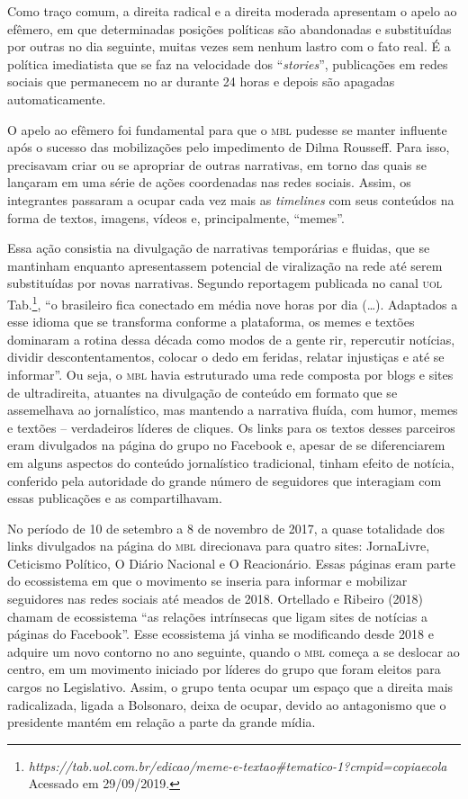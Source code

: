 Como traço comum, a direita radical e a direita moderada apresentam o
apelo ao efêmero, em que determinadas posições políticas são abandonadas
e substituídas por outras no dia seguinte, muitas vezes sem nenhum
lastro com o fato real. É a política imediatista que se faz na
velocidade dos ``\emph{stories}'', publicações em redes sociais que
permanecem no ar durante 24 horas e depois são apagadas automaticamente.

O apelo ao efêmero foi fundamental para que o \textsc{mbl} pudesse se manter
influente após o sucesso das mobilizações pelo impedimento de Dilma
Rousseff. Para isso, precisavam criar ou se apropriar de outras
narrativas, em torno das quais se lançaram em uma série de ações
coordenadas nas redes sociais. Assim, os integrantes passaram a ocupar
cada vez mais as \emph{timelines} com seus conteúdos na forma de textos,
imagens, vídeos e, principalmente, ``memes''.

Essa ação consistia na divulgação de narrativas temporárias e fluidas,
que se mantinham enquanto apresentassem potencial de viralização na rede
até serem substituídas por novas narrativas. Segundo reportagem
publicada no canal \textsc{uol} Tab.\footnote{\emph{https://tab.uol.com.br/edicao/meme-e-textao\#tematico-1?cmpid=copiaecola}
  Acessado em 29/09/2019.}, ``o brasileiro fica conectado em média nove
horas por dia (\ldots{}). Adaptados a esse idioma que se transforma conforme
a plataforma, os memes e textões dominaram a rotina dessa década como
modos de a gente rir, repercutir notícias, dividir descontentamentos,
colocar o dedo em feridas, relatar injustiças e até se informar''. Ou
seja, o \textsc{mbl} havia estruturado uma rede composta por blogs e sites de
ultradireita, atuantes na divulgação de conteúdo em formato que se
assemelhava ao jornalístico, mas mantendo a narrativa fluída, com humor,
memes e textões -- verdadeiros líderes de cliques. Os links para os
textos desses parceiros eram divulgados na página do grupo no Facebook
e, apesar de se diferenciarem em alguns aspectos do conteúdo
jornalístico tradicional, tinham efeito de notícia, conferido pela
autoridade do grande número de seguidores que interagiam com essas
publicações e as compartilhavam.

No período de 10 de setembro a 8 de novembro de 2017, a quase totalidade
dos links divulgados na página do \textsc{mbl} direcionava para quatro sites:
JornaLivre, Ceticismo Político, O Diário Nacional e O Reacionário. Essas
páginas eram parte do ecossistema em que o movimento se inseria para
informar e mobilizar seguidores nas redes sociais até meados de 2018.
Ortellado e Ribeiro (2018) chamam de ecossistema ``as relações
intrínsecas que ligam sites de notícias a páginas do Facebook''. Esse
ecossistema já vinha se modificando desde 2018 e adquire um novo
contorno no ano seguinte, quando o \textsc{mbl} começa a se deslocar ao centro,
em um movimento iniciado por líderes do grupo que foram eleitos para
cargos no Legislativo. Assim, o grupo tenta ocupar um espaço que a
direita mais radicalizada, ligada a Bolsonaro, deixa de ocupar, devido
ao antagonismo que o presidente mantém em relação a parte da grande
mídia.

